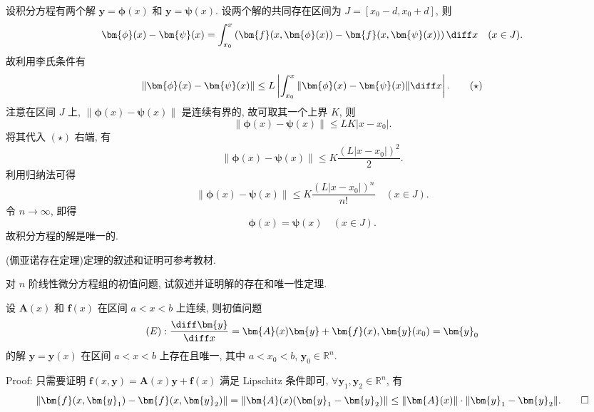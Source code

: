 \begin{solve}
  设积分方程有两个解 $\bm{y}=\bm{\phi}(x)$ 和 $\bm{y}=\bm{\psi}(x)$. 
  设两个解的共同存在区间为 $J=[x_0-d,x_0+d]$, 则
  \[\bm{\phi}(x)-\bm{\psi}(x)=\int_{x_0}^x\left(\bm{f}(x,\bm{\phi}(x))
    -\bm{f}(x,\bm{\psi}(x))\right)\diff x\quad(x\in J).\]
  故利用李氏条件有
  \begin{equation}
    \|\bm{\phi}(x)-\bm{\psi}(x)\|
    \leq L\left|\int_{x_0}^x\|\bm{\phi}(x)-\bm{\psi}(x)\|\diff x\right|.\tag{$\star$}
  \end{equation}
  注意在区间 $J$ 上, $\|\bm{\phi}(x)-\bm{\psi}(x)\|$ 是连续有界的, 故可取其一个上界 $K$, 则
  \[\|\bm{\phi}(x)-\bm{\psi}(x)\|\leq LK|x-x_0|.\]
  将其代入 $(\star)$ 右端, 有
  \[\|\bm{\phi}(x)-\bm{\psi}(x)\|\leq K\frac{(L|x-x_0|)^2}{2}.\]
  利用归纳法可得
  \[\|\bm{\phi}(x)-\bm{\psi}(x)\|\leq K\frac{(L|x-x_0|)^n}{n!}\quad (x\in J).\]
  令 $n\to\infty$, 即得
  \[\bm{\phi}(x)=\bm{\psi}(x)\quad (x\in J).\]
  故积分方程的解是唯一的.

  (佩亚诺存在定理)定理的叙述和证明可参考教材.
\end{solve}



\begin{exercise}
  对 $n$ 阶线性微分方程组的初值问题, 试叙述并证明解的存在和唯一性定理.
\end{exercise}

\begin{solve} 
  设 $\bm{A}(x)$ 和 $\bm{f}(x)$ 在区间 $a<x<b$ 上连续, 则初值问题
\[(E):\frac{\diff\bm{y}}{\diff x}=\bm{A}(x)\bm{y}+\bm{f}(x),\bm{y}(x_0)=\bm{y}_0\]
的解 $\bm{y}=\bm{y}(x)$ 在区间 $a<x<b$ 上存在且唯一, 其中 $a<x_0<b$, $\bm{y}_0\in\mathbb{R}^n$.

Proof: 只需要证明 $\bm{f}(x,\bm{y})=\bm{A}(x)\bm{y}+\bm{f}(x)$ 满足 Lipschitz 条件即可, 
$\forall\bm{y}_1,\bm{y}_2\in\mathbb{R}^n$, 有
\[\|\bm{f}(x,\bm{y}_1)-\bm{f}(x,\bm{y}_2)\|
  = \|\bm{A}(x)(\bm{y}_1-\bm{y}_2)\|\leq\|\bm{A}(x)\|\cdot\|\bm{y}_1-\bm{y}_2\|.\qedhere\]
\end{solve}